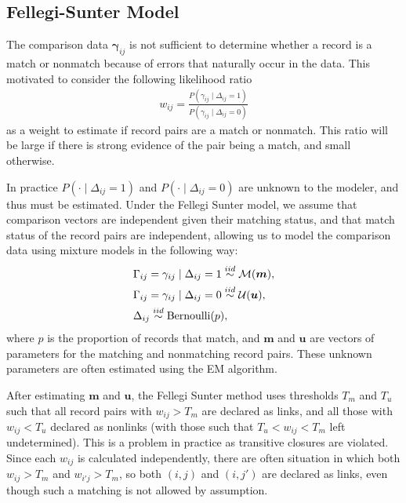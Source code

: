\documentclass[12pt,letterpaper]{article}
\newcommand{\1}[1]{\mathbb{I}\!\left[#1\right]} %
\begin{document}
{%

\subsection{Fellegi-Sunter Model}
The comparison data $\bm{\gamma}_{ij}$ is not sufficient to determine whether a record is a match or nonmatch because of errors that naturally occur in the data. This motivated \cite{fellegi_theory_1969} to consider the following likelihood ratio
\begin{align}
	\label{eqn:wts}
	w_{ij} = \frac{P(\gamma_{ij} \mid \Delta_{ij} = 1)}{P(\gamma_{ij} \mid \Delta_{ij} = 0)}
\end{align}
as a weight to estimate if record pairs are a match or nonmatch. This ratio will be large if there is strong evidence of the pair being a match, and small otherwise. 

In practice $P(\cdot \mid \Delta_{ij} = 1)$ and $P(\cdot \mid \Delta_{ij} = 0)$ are unknown to the modeler, and thus must be estimated. Under the Fellegi Sunter model, we assume that comparison vectors are independent given their matching status, and that match status of the record pairs are independent, allowing us to model 
the comparison data using mixture models in the following way:
\begin{align}
	&\Gamma_{ij} = \gamma_{ij} \mid \Delta_{ij} = 1 \stackrel{iid}{\sim} \mathcal{M}(\bm{m}), \\
	&\Gamma_{ij} = \gamma_{ij} \mid \Delta_{ij} = 0  \stackrel{iid}{\sim} \mathcal{U}(\bm{u}), \notag\\
	& \Delta_{ij}   \stackrel{iid}{\sim} \text{Bernoulli}(p), \notag
\end{align}
where $p$ is the proportion of records that match, and $\bm{m}$ and $\bm{u}$ are vectors of parameters for the matching and nonmatching record pairs. These unknown parameters are often estimated using the EM algorithm. 

After estimating $\bm{m}$ and $\bm{u}$, the Fellegi Sunter method uses thresholds $T_m$ and $T_u$ such that all record pairs with $w_{ij} > T_m$ are declared as links, and all those with $w_{ij} < T_u$ declared as nonlinks (with those such that $T_u < w_{ij} < T_m$ left undetermined). This is a problem in practice as transitive closures are violated. Since each $w_{ij}$ is calculated independently, there are often situation in which both $w_{ij} > T_m$ and $w_{i'j} > T_m$, so both $(i,j)$ and $(i, j')$ are declared as links, even though such a matching is not allowed by assumption. 

}
\end{document}
